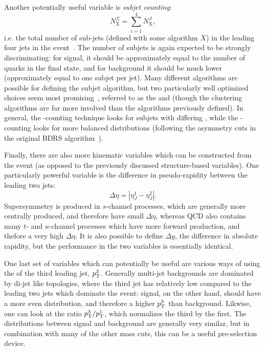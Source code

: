Another potentially useful variable is \textit{subjet counting}:
%
\begin{equation}
N_\mathrm{X}^\Sigma = \sum_{i=1}^4 N_\mathrm{X}^J,
\end{equation}
%
i.e. the total number of sub-jets (defined with some algorithm $X$) in the leading four jets in the event~\cite{SubjetCounting}. The number of subjets is again expected to be strongly discriminating: for signal, it should be approximately equal to the number of quarks in the final state, and for background it should be much lower (approximately equal to one subjet per jet). Many different algorithms are possible for defining the subjet algorithm, but two particularly well optimized choices seem most promising~\cite{SubjetCounting}, referred to as the \kt and \ca (though the clustering algorithms are far more involved than the algorithms previously defined). In general, the \kt-counting technique looks for subjets with differing \pt, while the \ca-counting looks for more balanced \pt distributions (following the asymmetry cuts in the original BDRS algorithm~\cite{BDRS}). 

Finally, there are also more kinematic variables which can be constructed from the event (as opposed to the previously discussed structure-based variables). One particularly powerful variable is the difference in pseudo-rapidity between the leading two jets:
%
\begin{equation}
\Delta \eta = |\eta_J^1 - \eta_J^2|.
\end{equation}
%
Supersymmetry is produced in $s$-channel processes, which are generally more centrally produced, and therefore have small $\Delta\eta$, whereas QCD also contains many $t$- and $u$-channel processes which have more forward production, and thefore a very high $\Delta\eta$. It is also possible to define $\Delta y$, the difference in absolute rapidity, but the performance in the two variables is essentially identical.

One last set of variables which can potentially be useful are various ways of using the \pt of the third leading jet, $p_{\text{T}}^3$. Generally multi-jet backgrounds are dominated by di-jet like topologies, where the third jet has relatively low \pt compared to the leading two jets which dominate the event: signal, on the other hand, should have a more even \pt distribution, and therefore a higher $p_{\text{T}}^3$ than background. Likwise, one can look at the ratio $p_{\text{T}}^3/p_{\text{T}}^1$, which normalizes the third \pt by the first. The \pt distributions between signal and background are generally very similar, but in combination with many of the other mass cuts, this can be a useful pre-selection device. 


